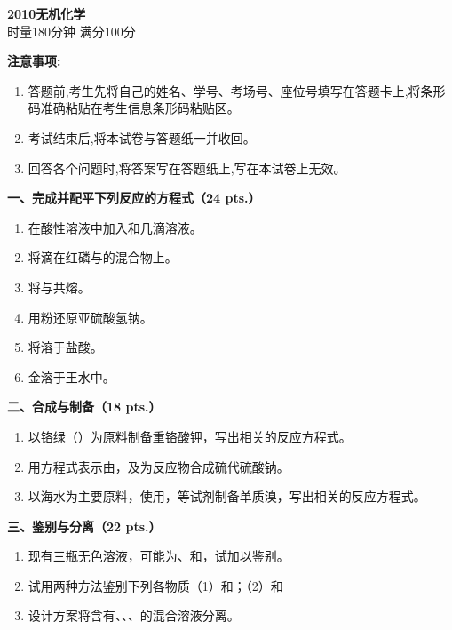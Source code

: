 \begin{center}
    {\LARGE \textbf{2010无机化学}} \\[2ex]
    {\large 时量180分钟 \quad 满分100分}
\end{center}

\vspace{0.5cm}
\noindent\textbf{注意事项:}
\begin{enumerate}[label=\arabic*., parsep=0pt, itemsep=0pt]
    \item 答题前,考生先将自己的姓名、学号、考场号、座位号填写在答题卡上,将条形码准确粘贴在考生信息条形码粘贴区。
    \item 考试结束后,将本试卷与答题纸一并收回。
    \item 回答各个问题时,将答案写在答题纸上,写在本试卷上无效。
\end{enumerate}

\vspace{0.5cm}
\noindent\textbf{一、完成并配平下列反应的方程式（24 pts.）}

\begin{enumerate}[label=\arabic*., start=1, itemsep=1.5ex]
    \item 在酸性溶液中加入和几滴溶液。
    \item 将滴在红磷与的混合物上。
    \item 将与共熔。
    \item 用粉还原亚硫酸氢钠。
    \item 将溶于盐酸。
    \item 金溶于王水中。
\end{enumerate}

\vspace{0.5cm}
\noindent\textbf{二、合成与制备（18 pts.）}

\begin{enumerate}[label=\arabic*., start=1, itemsep=1.5ex]
    \item 以铬绿（）为原料制备重铬酸钾，写出相关的反应方程式。
    \item 用方程式表示由，及为反应物合成硫代硫酸钠。
    \item 以海水为主要原料，使用，等试剂制备单质溴，写出相关的反应方程式。
\end{enumerate}

\vspace{0.5cm}
\noindent\textbf{三、鉴别与分离（22 pts.）}

\begin{enumerate}[label=\arabic*., start=1, itemsep=1.5ex]
    \item 现有三瓶无色溶液，可能为、和，试加以鉴别。
    \item 试用两种方法鉴别下列各物质（1）和；（2）和
    \item 设计方案将含有、、、的混合溶液分离。
\end{enumerate}

